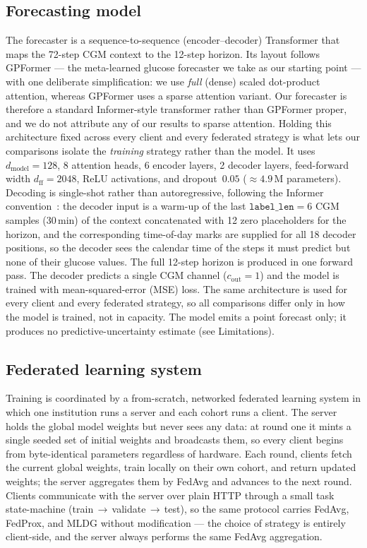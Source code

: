 \documentclass[10pt,letterpaper]{article}
\begin{document}
\subsection*{Forecasting model}

The forecaster is a sequence-to-sequence (encoder--decoder) Transformer that maps
the 72-step CGM context to the 12-step horizon. Its layout follows GPFormer
\cite{zhu2024gpformer} --- the meta-learned glucose forecaster we take as our
starting point --- with one deliberate simplification: we use \emph{full}
(dense) scaled dot-product attention, whereas GPFormer uses a sparse attention
variant. Our forecaster is therefore a standard Informer-style transformer rather
than GPFormer proper, and we do not attribute any of our results to sparse
attention. Holding this architecture fixed across every client and every federated
strategy is what lets our comparisons isolate the \emph{training} strategy rather
than the model. It uses
$d_{\text{model}}=128$, 8 attention heads, 6 encoder layers, 2 decoder layers,
feed-forward width $d_{\text{ff}}=2048$, ReLU activations, and dropout~$0.05$
($\approx 4.9$\,M parameters). Decoding is single-shot rather than
autoregressive, following the Informer convention~\cite{zhou2021informer}: the
decoder input is a warm-up of the last $\texttt{label\_len}=6$ CGM samples
(30\,min) of the context concatenated with 12 zero placeholders for the horizon,
and the corresponding time-of-day marks are supplied for all 18 decoder
positions, so the decoder sees the calendar time of the steps it must predict but
none of their glucose values. The full 12-step horizon is produced in one forward
pass. The decoder predicts a single CGM channel ($c_{\text{out}}=1$) and the
model is trained with mean-squared-error (MSE) loss. The same architecture is
used for every client and every federated strategy, so all comparisons differ
only in how the model is trained, not in capacity. The model emits a point
forecast only; it produces no predictive-uncertainty estimate (see Limitations).

\subsection*{Federated learning system}

Training is coordinated by a from-scratch, networked federated learning system
in which one institution runs a server and each cohort runs a client. The server
holds the global model weights but never sees any data: at round one it mints a
single seeded set of initial weights and broadcasts them, so every client begins
from byte-identical parameters regardless of hardware. Each round, clients fetch
the current global weights, train locally on their own cohort, and return updated
weights; the server aggregates them by FedAvg and advances to the next round.
Clients communicate with the server over plain HTTP through a small task
state-machine (train\,$\rightarrow$\,validate\,$\rightarrow$\,test), so the same
protocol carries FedAvg, FedProx, and MLDG without modification --- the choice of
strategy is entirely client-side, and the server always performs the same FedAvg
aggregation.
\end{document}
